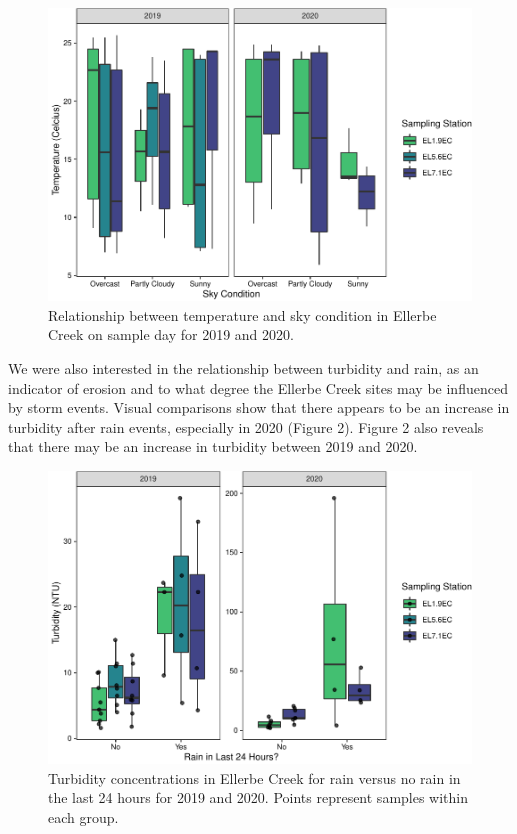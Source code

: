 \documentclass[
  12pt,
]{article}
\begin{document}
\begin{figure}
\centering
\includegraphics{August_Lindborg_ENV872_Project_files/figure-latex/unnamed-chunk-13-1.pdf}
\caption{Relationship between temperature and sky condition in Ellerbe
Creek on sample day for 2019 and 2020.}
\end{figure}

\newpage

We were also interested in the relationship between turbidity and rain,
as an indicator of erosion and to what degree the Ellerbe Creek sites
may be influenced by storm events. Visual comparisons show that there
appears to be an increase in turbidity after rain events, especially in
2020 (Figure 2). Figure 2 also reveals that there may be an increase in
turbidity between 2019 and 2020.

\begin{figure}
\centering
\includegraphics{August_Lindborg_ENV872_Project_files/figure-latex/unnamed-chunk-14-1.pdf}
\caption{Turbidity concentrations in Ellerbe Creek for rain versus no
rain in the last 24 hours for 2019 and 2020. Points represent samples
within each group.}
\end{figure}
\end{document}
